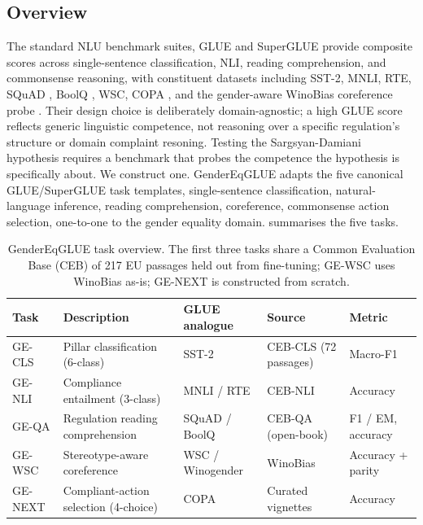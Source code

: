 \documentclass[pdflatex, sn-apa]{sn-jnl}%
\theoremstyle{thmstyleone}%
\theoremstyle{thmstyletwo}%
\theoremstyle{thmstylethree}%
\begin{document}
\subsection{Overview}
\label{sec:bench:overview}

The standard NLU benchmark suites, GLUE \citep{wang2018glue} and SuperGLUE
\citep{wang2019superglue} provide composite scores across single-sentence
classification, NLI, reading comprehension, and commonsense reasoning, with
constituent datasets including SST-2, MNLI, RTE, SQuAD
\citep{rajpurkar2016squad}, BoolQ \citep{clark2019boolq}, WSC, COPA
\citep{roemmele2011copa}, and the gender-aware WinoBias coreference probe
\citep{zhao2018winobias}. Their design choice is deliberately domain-agnostic; a
high GLUE score reflects generic linguistic competence, not reasoning over a
specific regulation's structure or domain complaint resoning. Testing the
Sargsyan-Damiani hypothesis requires a benchmark that probes the competence the
hypothesis is specifically about. We construct one. GenderEqGLUE adapts the five
canonical GLUE/SuperGLUE task templates, single-sentence classification,
natural-language inference, reading comprehension, coreference, commonsense
action selection, one-to-one to the gender equality domain. 
summarises the five tasks.


\begin{table}[h]
\centering
\caption{GenderEqGLUE task overview. The first three tasks share a Common
Evaluation Base (CEB) of 217 EU passages held out from fine-tuning; GE-WSC uses
WinoBias \citep{zhao2018winobias} as-is; GE-NEXT is constructed from scratch.}
\label{tab:tasks}
\small
\begin{tabularx}{\linewidth}{@{}lXllX@{}}
\toprule
Task    & Description                          & GLUE analogue   & Source
& Metric                       \\
\midrule
GE-CLS  & Pillar classification (6-class)      & SST-2           & CEB-CLS (72
passages)               & Macro-F1                     \\
GE-NLI  & Compliance entailment (3-class)      & MNLI / RTE      & CEB-NLI
                   & Accuracy                     \\
GE-QA   & Regulation reading comprehension     & SQuAD / BoolQ   & CEB-QA
(open-book)                  & F1 / EM, accuracy            \\
GE-WSC  & Stereotype-aware coreference         & WSC / Winogender& WinoBias
& Accuracy + parity            \\
GE-NEXT & Compliant-action selection (4-choice)& COPA            & Curated
vignettes                   & Accuracy                     \\
\bottomrule
\end{tabularx}
\end{table}
\end{document}
